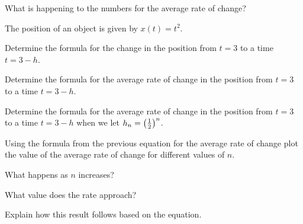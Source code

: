 \begin{problem}
\begin{subproblem}
    \item What is happening to the numbers for the average rate of change?

  \end{subproblem}

  \clearpage

\item The position of an object is given by $x(t)=t^2$. 
  \begin{subproblem}
    \item Determine the formula for the change in the position from
      $t=3$ to a time $t=3-h$.
      \vfill

    \item Determine the formula for the average rate of change in the
      position from $t=3$ to a time $t=3-h$.
      \vfill

    \item Determine the formula for the average rate of change in the
      position from $t=3$ to a time $t=3-h$ when we let $h_n=\left(\frac{1}{2}\right)^n$.

      \vspace{3em}

  \end{subproblem}


  \clearpage

\item Using the formula from the previous equation for the average
  rate of change plot the value of the average rate of change for
  different values of $n$.

  \scalebox{0.7}{}

  \begin{subproblem}
    \item What happens as $n$ increases?
      \vspace{3em}
    \item What value does the rate approach?
      \vspace{3em}
    \item Explain how this result follows based on the equation.
      \vspace{3em}
  \end{subproblem}

\end{problem}

\postClass

